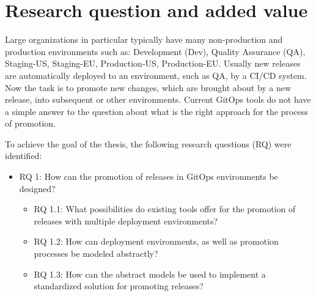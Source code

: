 \section{Research question and added value}


%
Large organizations in particular typically have many
non-production and production environments
such as:
Development (Dev),
Quality Assurance (QA),
Staging-US,
Staging-EU,
Production-US,
Production-EU.
Usually new releases are automatically deployed to an environment,
such as QA, 
by a CI/CD system.
Now the task is to promote
new changes, which are brought about by a new release,
into subsequent or other environments.
Current GitOps tools do not have a simple answer to
the question about what is the right approach for the process of promotion.
\bigskip


\noindent
To achieve the goal of the thesis, the following research questions (RQ) were identified:

\begin{itemize}
	\item RQ 1: How can the promotion of releases in GitOps environments be designed?
	\begin{itemize}
		\item RQ 1.1: What possibilities do existing tools offer for the promotion of releases with multiple deployment environments?
		\item RQ 1.2: How can deployment environments, as well as promotion processes be modeled abstractly?
		\item RQ 1.3: How can the abstract models be used to implement a standardized solution for promoting releases?
	\end{itemize}
\end{itemize}










